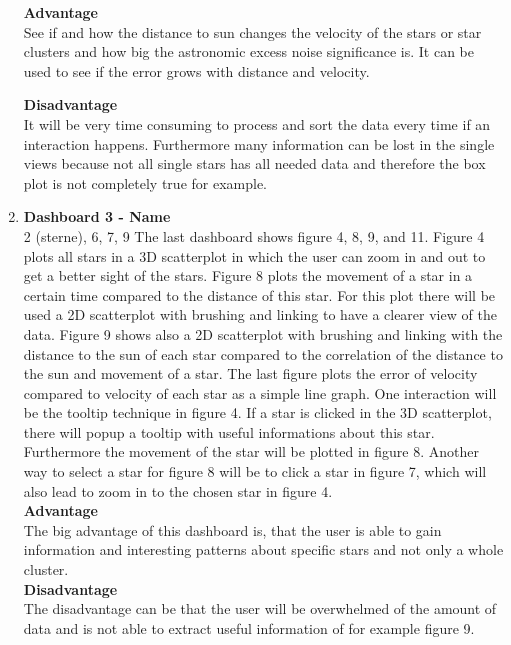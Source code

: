 \documentclass{article}
\begin{document}
\begin{enumerate}
\textbf{Advantage} \\
See if and how the distance to sun changes the velocity of the stars or star clusters and how big the astronomic excess noise significance is. It can be used to see if the error grows with distance and velocity.

\textbf{Disadvantage} \\
It will be very time consuming to process and sort the data every time if an interaction happens. Furthermore many information can be lost in the single views because not all single stars has all needed data and therefore the box plot is not completely true for example.

\item \textbf{Dashboard 3 - Name} \\
2 (sterne), 6, 7, 9
The last dashboard shows figure 4, 8, 9, and 11. Figure 4 plots all stars in a 3D scatterplot in which the user can zoom in and out to get a better sight of the stars. Figure 8 plots the movement of a star in a certain time compared to the distance of this star. For this plot there will be used a 2D scatterplot with brushing and linking to have a clearer view of the data. Figure 9 shows also a 2D scatterplot with brushing and linking with the distance to the sun of each star compared to the correlation of the distance to the sun and movement of a star. The last figure plots the error of velocity compared to velocity of each star as a simple line graph. One interaction will be the tooltip technique in figure 4. If a star is clicked in the 3D scatterplot, there will popup a tooltip with useful informations about this star. Furthermore the movement of the star will be plotted in figure 8. Another way to select a star for figure 8 will be to click a star in figure 7, which will also lead to zoom in to the chosen star in figure 4. \\

\textbf{Advantage} \\
The big advantage of this dashboard is, that the user is able to gain information and interesting patterns about specific stars and not only a whole cluster. \\

\textbf{Disadvantage} \\
The disadvantage can be that the user will be overwhelmed of the amount of data and is not able to extract useful information of for example figure 9.  \\

\end{enumerate}
\end{document}
